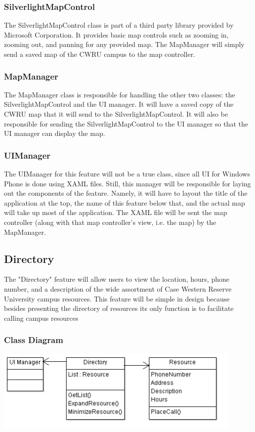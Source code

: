 \documentclass[pdftex,12pt,letter]{article}
\begin{document}
\subsubsection{SilverlightMapControl}
The SilverlightMapControl class is part of a third party library provided by Microsoft Corporation. It provides basic map controls such as zooming in, zooming out, and panning for any provided map. The MapManager will simply send a saved map of the CWRU campus to the map controller.
\subsubsection{MapManager}
The MapManager class is responsible for handling the other two classes: the SilverlightMapControl and the UI manager. It will have a saved copy of the CWRU map that it will send to the SilverlightMapControl. It will also be responsible for sending the SilverlightMapControl to the UI manager so that the UI manager can display the map.
\subsubsection{UIManager}
The UIManager for this feature will not be a true class, since all UI for Windows Phone is done using XAML files. Still, this manager will be responsible for laying out the components of the feature. Namely, it will have to layout the title of the application at the top, the name of this feature below that, and the actual map will take up most of the application. The XAML file will be sent the map controller (along with that map controller's view, i.e. the map)  by the MapManager.
\subsection{Directory}
The "Directory" feature will allow users to view the location, hours, phone number, and a description of the wide assortment of Case Western Reserve University campus resources. This feature will be simple in design because besides presenting the directory of resources its only function is to facilitate calling campus resources 
\subsubsection{Class Diagram}
\begin{flushleft}
\includegraphics[width=120mm]{DirectoryCD.png}
\end{flushleft}
\end{document}
